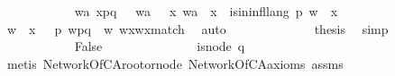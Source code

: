 \begin{isabellebody}
\ \ \ \ \ \ \ \ \ \ \isamarkupfalse%
\ {\isachardoublequoteopen}{\isasymexists}wa{\isachardot}{\kern0pt}\ x{\isacharprime}{\kern0pt}{\isasymdown}\isactrlsub {\isacharbang}{\kern0pt}{\isasymdown}\isactrlsub {\isacharbraceleft}{\kern0pt}\isactrlsub p\isactrlsub {\isacharcomma}{\kern0pt}\isactrlsub q\isactrlsub {\isacharbraceright}{\kern0pt}{\isasymdown}\isactrlsub {\isacharbang}{\kern0pt}\isactrlsub {\isacharquery}{\kern0pt}\ {\isacharequal}{\kern0pt}\ \ wa{\isasymdown}\isactrlsub {\isacharbang}{\kern0pt}\isactrlsub {\isacharquery}{\kern0pt}\ {\isasymand}\ \ {\isacharparenleft}{\kern0pt}{\isasymexists}x{\isachardot}{\kern0pt}\ wa\ {\isacharequal}{\kern0pt}\ x{\isasymdown}\isactrlsub {\isacharquery}{\kern0pt}\ {\isasymand}\ is{\isacharunderscore}{\kern0pt}in{\isacharunderscore}{\kern0pt}infl{\isacharunderscore}{\kern0pt}lang\ p\ {\isacharparenleft}{\kern0pt}w\ {\isasymsqdot}\ x{\isacharparenright}{\kern0pt}{\isacharparenright}{\kern0pt}{\isachardoublequoteclose}\ \ \isamarkupfalse%
\ {\isacartoucheopen}w\ {\isasymsqdot}\ x\ {\isasymin}\ {\isasymL}\isactrlsup {\isacharasterisk}{\kern0pt}\ p{\isacartoucheclose}\ {\isacartoucheopen}w{\isacharprime}{\kern0pt}{\isasymdown}\isactrlsub {\isacharbang}{\kern0pt}{\isasymdown}\isactrlsub {\isacharbraceleft}{\kern0pt}\isactrlsub p\isactrlsub {\isacharcomma}{\kern0pt}\isactrlsub q\isactrlsub {\isacharbraceright}{\kern0pt}{\isasymdown}\isactrlsub {\isacharbang}{\kern0pt}\isactrlsub {\isacharquery}{\kern0pt}\ {\isacharequal}{\kern0pt}\ w{\isasymdown}\isactrlsub {\isacharquery}{\kern0pt}{\isasymdown}\isactrlsub {\isacharbang}{\kern0pt}\isactrlsub {\isacharquery}{\kern0pt}{\isacartoucheclose}\ w{\isacharprime}{\kern0pt}x{\isacharprime}{\kern0pt}{\isacharunderscore}{\kern0pt}wx{\isacharunderscore}{\kern0pt}match\ \isamarkupfalse%
\ auto\isanewline
\ \ \ \ \ \ \ \ \ \ \isamarkupfalse%
\ \isamarkupfalse%
\ {\isacharquery}{\kern0pt}thesis\ \isamarkupfalse%
\ simp\isanewline
\ \ \ \ \ \ \ \ \isamarkupfalse%
\isanewline
\ \ \ \ \ \ \ \ \ \ \isamarkupfalse%
\ False\ \isanewline
\ \ \ \ \ \ \ \ \ \ \isamarkupfalse%
\ \isamarkupfalse%
\ {\isachardoublequoteopen}is{\isacharunderscore}{\kern0pt}node\ q{\isachardoublequoteclose}\ \isamarkupfalse%
\ {\isacharparenleft}{\kern0pt}metis\ NetworkOfCA{\isachardot}{\kern0pt}root{\isacharunderscore}{\kern0pt}or{\isacharunderscore}{\kern0pt}node\ NetworkOfCA{\isacharunderscore}{\kern0pt}axioms\ assms{\isacharparenright}{\kern0pt}\isanewline

\end{isabellebody}
